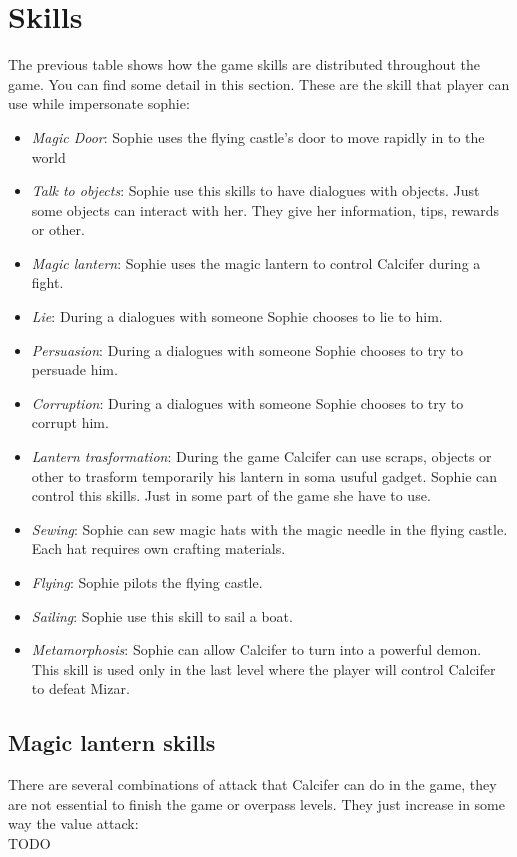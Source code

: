 \section{Skills}
The previous table shows how the game skills are distributed throughout the game. You can find some detail in this section. These are the skill that player can use while impersonate sophie:
\begin{itemize}
\item \textit{Magic Door}: Sophie uses the flying castle's door to move rapidly in to the world
\item \textit{Talk to objects}: Sophie use this skills to have dialogues with objects. Just some objects can interact with her. They give her information, tips, rewards or other.
\item \textit{Magic lantern}: Sophie uses the magic lantern to control Calcifer during a fight.
\item \textit{Lie}: During a dialogues with someone Sophie chooses to lie to him.
\item \textit{Persuasion}: During a dialogues with someone Sophie chooses to try to persuade him.
\item \textit{Corruption}: During a dialogues with someone Sophie chooses to try to corrupt him.
\item \textit{Lantern trasformation}: During the game Calcifer can use scraps, objects or other to trasform temporarily his lantern in soma usuful gadget. Sophie can control this skills. Just in some part of the game she have to use.
\item \textit{Sewing}: Sophie can sew magic hats with the magic needle in the flying castle. Each hat requires own crafting materials.
\item \textit{Flying}: Sophie pilots the flying castle.
\item \textit{Sailing}: Sophie use this skill to sail a boat.
\item \textit{Metamorphosis}: Sophie can allow Calcifer to turn into a powerful demon. This skill is used only in the last level where the player will control Calcifer to defeat Mizar.
\end{itemize}

\subsection{Magic lantern skills}
There are several combinations of attack that Calcifer can do in the game, they are not essential to finish the game or overpass levels. They just increase in some way the value attack:\\
TODO

